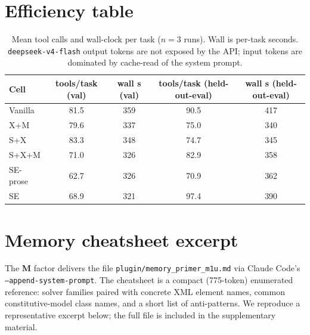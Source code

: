 \documentclass{article}
\begin{document}
\section{Efficiency table}
\label{app:results}

\begin{table}[h]
  \caption{Mean tool calls and wall-clock per task ($n=3$ runs). Wall is per-task seconds. \texttt{deepseek-v4-flash} output tokens are not exposed by the API; input tokens are dominated by cache-read of the system prompt.}
  \label{tab:efficiency}
  \centering
  \small
  \begin{tabular}{lcccc}
    \toprule
    \textbf{Cell} & \textbf{tools/task (val)} & \textbf{wall s (val)} & \textbf{tools/task (held-out-eval)} & \textbf{wall s (held-out-eval)} \\
    \midrule
    Vanilla  & 81.5 & 359 & 90.5 & 417 \\
    X+M  & 79.6 & 337 & 75.0 & 340 \\
    S+X  & 83.3 & 348 & 74.7 & 345 \\
    S+X+M  & 71.0 & 326 & 82.9 & 358 \\
    SE-prose & 62.7 & 326 & 70.9 & 362 \\
    SE  & 68.9 & 321 & 97.4 & 390 \\
    \bottomrule
  \end{tabular}
\end{table}

\section{Memory cheatsheet excerpt}
\label{app:cheatsheet}

The \textbf{M} factor delivers the file \texttt{plugin/memory\_primer\_m1u.md} via Claude Code's \texttt{--append-system-prompt}. The cheatsheet is a compact (775-token) enumerated reference: solver families paired with concrete XML element names, common constitutive-model class names, and a short list of anti-patterns. We reproduce a representative excerpt below; the full file is included in the supplementary material.
\end{document}
